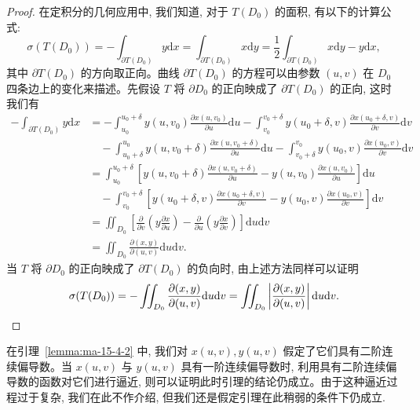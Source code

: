 \begin{proof}
在定积分的几何应用中, 我们知道, 对于 $T(D_0)$ 的面积, 有以下的计算公式:
\[
  \sigma(T(D_0))=-\int_{\partial T(D_0)}y\mathrm dx
  =\int_{\partial T(D_0)}x\mathrm dy
  =\frac12\int_{\partial T(D_0)}x\mathrm dy-y\mathrm dx,
\]
其中 $\partial T(D_0)$ 的方向取正向。曲线 $\partial T(D_0)$ 的方程可以由参数 $(u,v)$ 在 $D_0$ 四条边上的变化来描述。先假设 $T$ 将 $\partial D_0$ 的正向映成了 $\partial T(D_0)$ 的正向, 这时我们有
\[
\begin{aligned}
  -\int_{\partial T(D_0)}y\mathrm dx
  &=-\int_{u_0}^{u_0+\delta}y(u,v_0)\frac{\partial x(u,v_0)}{\partial u}\mathrm du
    -\int_{v_0}^{v_0+\delta}y(u_0+\delta,v)\frac{\partial x(u_0+\delta,v)}{\partial v}\mathrm dv\\
  &\quad-\int_{u_0+\delta}^{u_0}y(u,v_0+\delta)\frac{\partial x(u,v_0+\delta)}{\partial u}\mathrm du
    -\int_{v_0+\delta}^{v_0}y(u_0,v)\frac{\partial x(u_0,v)}{\partial v}\mathrm dv\\
  &=\int_{u_0}^{u_0+\delta}
    \left[y(u,v_0+\delta)\frac{\partial x(u,v_0+\delta)}{\partial u}
    -y(u,v_0)\frac{\partial x(u,v_0)}{\partial u}\right]\mathrm du\\
  &\quad-\int_{v_0}^{v_0+\delta}
    \left[y(u_0+\delta,v)\frac{\partial x(u_0+\delta,v)}{\partial v}
    -y(u_0,v)\frac{\partial x(u_0,v)}{\partial v}\right]\mathrm dv\\
  &=\iint_{D_0}\left[
    \frac{\partial}{\partial v}\left(y\frac{\partial x}{\partial u}\right)
    -\frac{\partial}{\partial u}\left(y\frac{\partial x}{\partial v}\right)
    \right]\mathrm du\mathrm dv\\
  &=\iint_{D_0}\frac{\partial(x,y)}{\partial(u,v)}\mathrm du\mathrm dv.
\end{aligned}
\]
当 $T$ 将 $\partial D_0$ 的正向映成了 $\partial T(D_0)$ 的负向时, 由上述方法同样可以证明
\[
  \sigma(T(D_0))=-\iint_{D_0}\frac{\partial(x,y)}{\partial(u,v)}\mathrm du\mathrm dv
  =\iint_{D_0}\left|\frac{\partial(x,y)}{\partial(u,v)}\right|\mathrm du\mathrm dv.
\qedhere
\]
\end{proof}


\begin{remark}\label{remark:ma-15-source-47}
在引理~\ref{lemma:ma-15-4-2} 中, 我们对 $x(u,v),y(u,v)$ 假定了它们具有二阶连续偏导数。当 $x(u,v)$ 与 $y(u,v)$ 具有一阶连续偏导数时, 利用具有二阶连续偏导数的函数对它们进行逼近, 则可以证明此时引理的结论仍成立。由于这种逼近过程过于复杂, 我们在此不作介绍, 但我们还是假定引理在此稍弱的条件下仍成立.
\end{remark}


